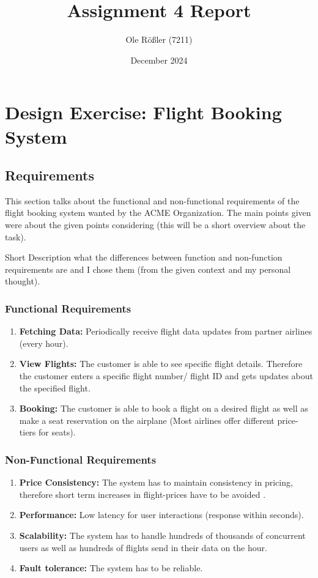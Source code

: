 \documentclass{article}
\title{Assignment 4 Report}
\author{Ole Rößler (7211)}
\date{December 2024}
\begin{document}
\maketitle
\tableofcontents

\newpage
\section{Design Exercise: Flight Booking System}

\subsection{Requirements}
This section talks about the functional and non-functional requirements of the flight booking system wanted by the ACME Organization. 
The main points given were about the given points considering (this will be a short overview about the task).

Short Description what the differences between function and non-function requirements are and I chose them (from the given context and my personal thought).

\subsubsection{Functional Requirements}
\begin{enumerate}

\item \textbf{Fetching Data:}
Periodically receive flight data updates from partner airlines (every hour).
\item \textbf{View Flights:}
The customer is able to see specific flight details. 
Therefore the customer enters a specific flight number/ flight ID and gets updates about the specified flight.
\item \textbf{Booking:}
The customer is able to book a flight on a desired flight as well as make a seat reservation on the airplane (Most airlines offer different price-tiers for seats). 
\end{enumerate}

\subsubsection{Non-Functional Requirements}
\begin{enumerate}
\item \textbf{Price Consistency:}
The system has to maintain consistency in pricing, therefore short term increases in flight-prices have to be avoided .
\item \textbf{Performance:}
Low latency for user interactions (response within seconds).
\item \textbf{Scalability:}
The system has to handle hundreds of thousands of concurrent users as well as hundreds of flights send in their data on the hour.
\item \textbf{Fault tolerance:}
The system has to be reliable.
\end{enumerate}
\end{document}
